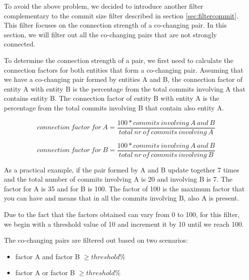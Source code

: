 To avoid the above problem, we decided to introduce another filter complementary to the commit size filter described in section \ref{sec:filtercommit}.
This filter focuses on the connection strength of a co-changing pair. In this section, we will filter out all the co-changing pairs that are not strongly connected.

To determine the connection strength of a pair, we first need to calculate the connection factors for both entities that form a co-changing pair.
Assuming that we have a co-changing pair formed by entities A and B, the connection factor of entity A with entity B is the percentage from the total commits involving A that contains entity B. The connection factor of entity B with entity A is the percentage from the total commits involving B that contain also entity A.

\begin{equation}
 connection\ factor\ for\ A = \frac{100 * commits\ involving\ A\ and\ B}{total\ nr\ of\ commits\ involving\ A}
\end{equation}

\begin{equation}
 connection\ factor\ for\ B = \frac{100 * commits\ involving\ A\ and\ B}{total\ nr\ of\ commits\ involving\ B}
\end{equation}

As a practical example, if the pair formed by A and B update together 7 times and the total number of commits involving A is 20 and involving B is 7. The factor for A is 35 and for B is 100. The factor of 100 is the maximum factor that you can have and means that in all the commits involving B, also A is present.

Due to the fact that the factors obtained can vary from 0 to 100, for this filter, we begin with a threshold value of 10 and increment it by 10 until we reach 100. 

The co-changing pairs are filtered out based on two scenarios:
\begin{itemize}
	\item factor A and factor B $\geq threshold \%$ 
	\item factor A or factor B $\geq threshold \%$ 
\end{itemize}

